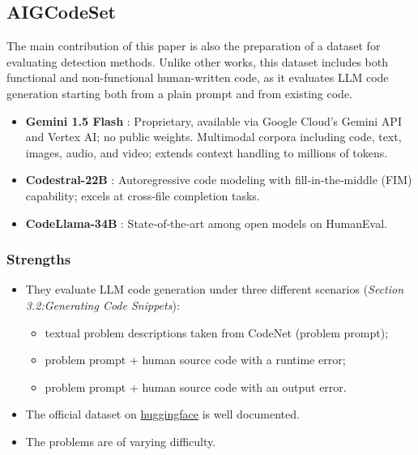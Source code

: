 \subsection{AIGCodeSet}
\label{section:AiGCodeSet}
The main contribution of this paper is also the preparation 
of a dataset for evaluating detection methods. Unlike other 
works, this dataset includes both functional and non-functional 
human-written code, as it evaluates LLM code generation starting 
both from a plain prompt and from existing code.


\begin{itemize}
    \item \textbf{Gemini 1.5 Flash} \cite{team2024gemini} : 
    Proprietary, available via Google Cloud’s Gemini API and Vertex AI; 
    no public weights. Multimodal corpora including code, text, images, 
    audio, and video; extends context handling to millions of tokens. 
    \item \textbf{Codestral-22B} \cite{mistral-codestral-2024} : 
    Autoregressive code modeling with fill‑in‑the‑middle (FIM) 
    capability; excels at cross‑file completion tasks.
    \item \textbf{CodeLlama-34B} \cite{roziere2023code} :
    State‑of‑the‑art among open models on HumanEval.
\end{itemize}





\subsubsection*{Strengths}
\begin{itemize}
    \item They evaluate LLM code generation under three different scenarios 
    {(\scriptsize\textit{Section 3.2:Generating Code Snippets})}:
    \begin{itemize}
        \item textual problem descriptions taken from CodeNet (problem prompt);
        \item problem prompt + human source code with a runtime error;
        \item problem prompt + human source code with an output error.
    \end{itemize}
    \item The official dataset on 
    \href{{https://huggingface.co/datasets/basakdemirok/AIGCodeSet}}{huggingface}
    is well documented. 
    \item The problems are of varying difficulty.
\end{itemize}


